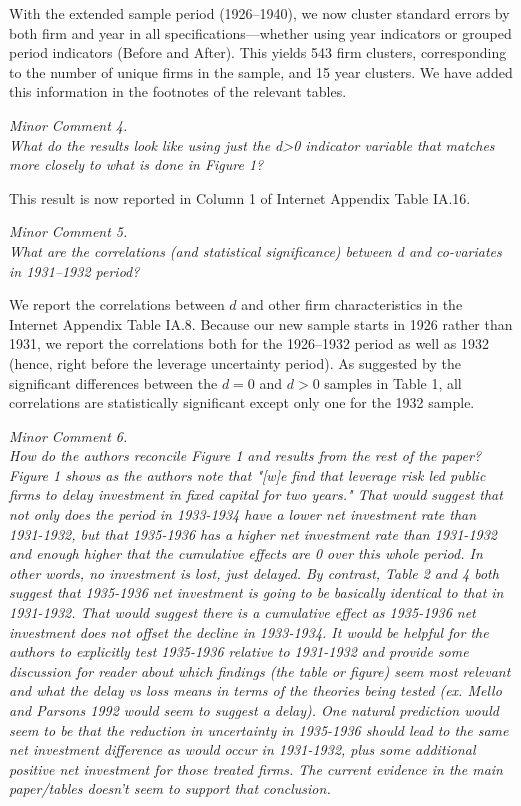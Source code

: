 \bigskip

\noindent With the extended sample period (1926--1940), we now cluster standard errors by both firm and year in all specifications—whether using year indicators or grouped period indicators (Before and After). This yields 543 firm clusters, corresponding to the number of unique firms in the sample, and 15 year clusters. We have added this information in the footnotes of the relevant tables.


\noindent \textit{\textcolor{red!60!black}{
Minor Comment 4.\\
What do the results look like using just the d>0 indicator variable that matches more closely to what is done in Figure 1?
}}

\bigskip

\noindent This result is now reported in Column 1 of Internet Appendix Table IA.16.

\noindent \textit{\textcolor{red!60!black}{
Minor Comment 5.\\
What are the correlations (and statistical significance) between d and co-variates in 1931--1932 period?
}}

\bigskip

\noindent We report the correlations between $d$ and other firm characteristics in the Internet Appendix Table IA.8. Because our new sample starts in 1926 rather than 1931, we report the correlations both for the 1926--1932 period as well as 1932 (hence, right before the leverage uncertainty period). As suggested by the significant differences between the $d = 0$ and $d > 0$ samples in Table 1, all correlations are statistically significant except only one for the 1932 sample. 

\noindent \textit{\textcolor{red!60!black}{
Minor Comment 6.\\
How do the authors reconcile Figure 1 and results from the rest of the paper? Figure 1 shows as the authors note that "[w]e find that leverage risk led public firms to delay investment in fixed capital for two years." That would suggest that not only does the period in 1933-1934 have a lower net investment rate than 1931-1932, but that 1935-1936 has a higher net investment rate than 1931-1932 and enough higher that the cumulative effects are 0 over this whole period. In other words, no investment is lost, just delayed. By contrast, Table 2 and 4 both suggest that 1935-1936 net investment is going to be basically identical to that in 1931-1932. That would suggest there is a cumulative effect as 1935-1936 net investment does not offset the decline in 1933-1934. It would be helpful for the authors to explicitly test 1935-1936 relative to 1931-1932 and provide some discussion for reader about which findings (the table or figure) seem most relevant and what the delay vs loss means in terms of the theories being tested (ex. Mello and Parsons 1992 would seem to suggest a delay). One natural prediction would seem to be that the reduction in uncertainty in 1935-1936 should lead to the same net investment difference as would occur in 1931-1932, plus some additional positive net investment for those treated firms. The current evidence in the main paper/tables doesn't seem to support that conclusion. 
}}

